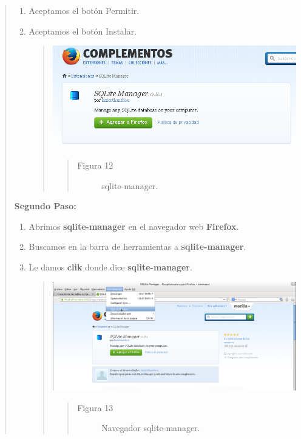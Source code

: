 \documentclass[letterpaper,11pt,spanish]{sphinxmanual}
\begin{document}
\begin{quote}
\begin{enumerate}
\item {} 
Aceptamos el botón Permitir.

\item {} 
Aceptamos el botón Instalar.
\begin{quote}

\includegraphics{sqlite_manager.png}
\begin{quote}\begin{description}
\item[{Figura 12}] \leavevmode
sqlite-manager.

\end{description}\end{quote}
\end{quote}

\end{enumerate}

\textbf{Segundo Paso:}
\begin{enumerate}
\item {} 
Abrimos \textbf{sqlite-manager} en el navegador web \textbf{Firefox}.

\item {} 
Buscamos en la barra de herramientas a \textbf{sqlite-manager}.

\item {} 
Le damos \textbf{clik} donde dice \textbf{sqlite-manager}.
\begin{quote}

\includegraphics{buscar.png}
\begin{quote}\begin{description}
\item[{Figura 13}] \leavevmode
Navegador sqlite-manager.


\end{description}
\end{quote}
\end{quote}
\end{enumerate}
\end{quote}
\end{document}
